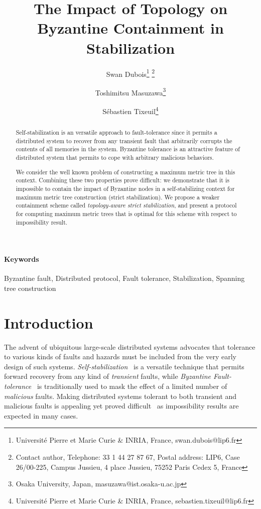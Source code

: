 \documentclass[11pt]{article}
\begin{document}
\title{The Impact of Topology on Byzantine Containment in Stabilization}

\author{Swan Dubois\protect\footnote{Universit\'e Pierre et Marie Curie \& INRIA, France, swan.dubois@lip6.fr} \footnote{Contact author, Telephone: 33 1 44 27 87 67, Postal address: LIP6, Case 26/00-225, Campus Jussieu, 4 place Jussieu, 75252 Paris Cedex 5, France} \and Toshimitsu Masuzawa\protect\footnote{Osaka University, Japan, masuzawa@ist.osaka-u.ac.jp} \and S\'{e}bastien Tixeuil\protect\footnote{Universit\'e Pierre et Marie Curie \& INRIA, France, sebastien.tixeuil@lip6.fr}}
\date{}

\maketitle

\begin{abstract}
Self-stabilization is an versatile approach to fault-tolerance since it permits a distributed system to recover from any transient fault that arbitrarily corrupts the contents of all memories in the system. Byzantine tolerance is an attractive feature of distributed system that permits to cope with arbitrary malicious behaviors. 

We consider the well known problem of constructing a maximum metric tree in this context. Combining these two properties prove difficult: we demonstrate that it is impossible to contain the impact of Byzantine nodes in a self-stabilizing context for maximum metric tree construction (strict stabilization). We propose a weaker containment scheme called \emph{topology-aware strict stabilization}, and present a protocol for computing maximum metric trees that is optimal for this scheme with respect to impossibility result.
\end{abstract}

\paragraph{Keywords}
Byzantine fault, Distributed protocol, Fault tolerance,
Stabilization, Spanning tree construction

\section{Introduction}

The advent of ubiquitous large-scale distributed systems advocates that tolerance to various kinds of faults and hazards must be included from the very early design of such systems. \emph{Self-stabilization}~\cite{D74j,D00b,T09bc} is a versatile technique that permits forward recovery from any kind of \emph{transient} faults, while \emph{Byzantine Fault-tolerance}~\cite{LSP82j} is traditionally used to mask the effect of a limited number of \emph{malicious} faults. Making distributed systems tolerant to both transient and malicious faults is appealing yet proved difficult~\cite{DW04j,DD05c,NA02c} as impossibility results are expected in many cases.
\end{document}
